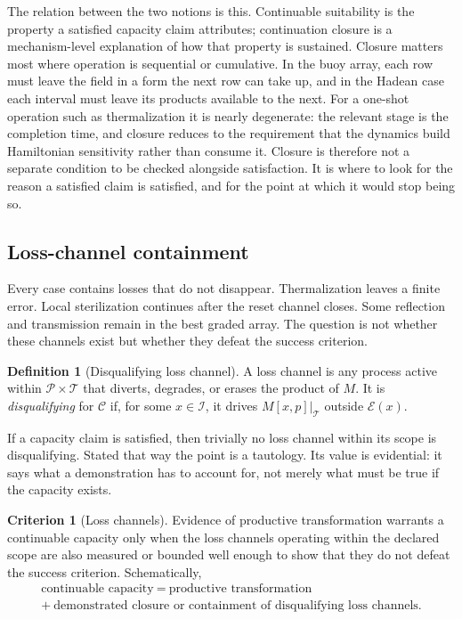 \documentclass[11pt]{article}
\theoremstyle{definition}
\newtheorem{definition}{Definition}
\newtheorem{criterion}{Criterion}
\newcommand{\Iset}{\mathcal I}
\newcommand{\Pset}{\mathcal P}
\newcommand{\Tset}{\mathcal T}
\newcommand{\Eset}{\mathcal E}
\newcommand{\Cclaim}{\mathcal C}
\begin{document}
The relation between the two notions is this. Continuable suitability is the property a satisfied capacity claim attributes; continuation closure is a mechanism-level explanation of how that property is sustained. Closure matters most where operation is sequential or cumulative. In the buoy array, each row must leave the field in a form the next row can take up, and in the Hadean case each interval must leave its products available to the next. For a one-shot operation such as thermalization it is nearly degenerate: the relevant stage is the completion time, and closure reduces to the requirement that the dynamics build Hamiltonian sensitivity rather than consume it. Closure is therefore not a separate condition to be checked alongside satisfaction. It is where to look for the reason a satisfied claim is satisfied, and for the point at which it would stop being so.

\subsection{Loss-channel containment}\label{sec:losses}

Every case contains losses that do not disappear. Thermalization leaves a finite error. Local sterilization continues after the reset channel closes. Some reflection and transmission remain in the best graded array. The question is not whether these channels exist but whether they defeat the success criterion.

\begin{definition}[Disqualifying loss channel]
A loss channel is any process active within $\Pset\times\Tset$ that diverts, degrades, or erases the product of $M$. It is \emph{disqualifying} for $\Cclaim$ if, for some $x\in\Iset$, it drives $M[x,p]|_{\Tset}$ outside $\Eset(x)$.
\end{definition}

If a capacity claim is satisfied, then trivially no loss channel within its scope is disqualifying. Stated that way the point is a tautology. Its value is evidential: it says what a demonstration has to account for, not merely what must be true if the capacity exists.

\begin{criterion}[Loss channels]
Evidence of productive transformation warrants a continuable capacity only when the loss channels operating within the declared scope are also measured or bounded well enough to show that they do not defeat the success criterion. Schematically,
\begin{multline}
\text{continuable capacity}\ =\ \text{productive transformation}\\
+\ \text{demonstrated closure or containment of disqualifying loss channels}.
\end{multline}
\end{criterion}
\end{document}
